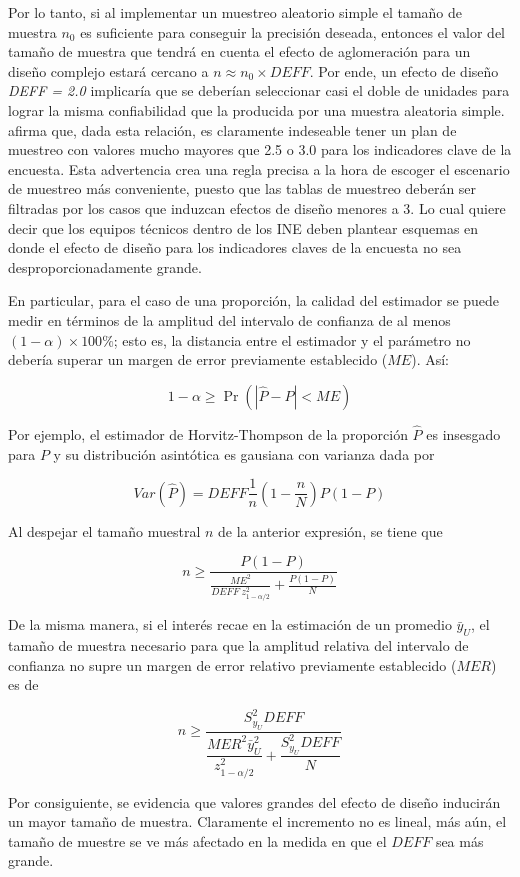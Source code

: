 \documentclass[
  12pt,
]{book}
\begin{document}
Por lo tanto, si al implementar un muestreo aleatorio simple el tamaño de muestra \(n_0\) es suficiente para conseguir la precisión deseada, entonces el valor del tamaño de muestra que tendrá en cuenta el efecto de aglomeración para un diseño complejo estará cercano a \(n \approx n_0 \times DEFF\). Por ende, un efecto de diseño \emph{DEFF = 2.0} implicaría que se deberían seleccionar casi el doble de unidades para lograr la misma confiabilidad que la producida por una muestra aleatoria simple. \citet{United_Nations_2008} afirma que, dada esta relación, es claramente indeseable tener un plan de muestreo con valores mucho mayores que 2.5 o 3.0 para los indicadores clave de la encuesta. Esta advertencia crea una regla precisa a la hora de escoger el escenario de muestreo más conveniente, puesto que las tablas de muestreo deberán ser filtradas por los casos que induzcan efectos de diseño menores a 3. Lo cual quiere decir que los equipos técnicos dentro de los INE deben plantear esquemas en donde el efecto de diseño para los indicadores claves de la encuesta no sea desproporcionadamente grande.

En particular, para el caso de una proporción, la calidad del estimador se puede medir en términos de la amplitud del intervalo de confianza de al menos \((1-\alpha) \times 100\%\); esto es, la distancia entre el estimador y el parámetro no debería superar un margen de error previamente establecido (\(ME\)). Así:

\[
1-\alpha \geq \Pr\left(|\hat{P}-P|<ME\right)
\]

Por ejemplo, el estimador de Horvitz-Thompson de la proporción \(\hat{P}\) es insesgado para \(P\) y su distribución asintótica es gausiana con varianza dada por

\[
Var\left(\hat{P}\right)=DEFF\frac{1}{n}(1-\frac{n}{N})P(1-P)
\]

Al despejar el tamaño muestral \(n\) de la anterior expresión, se tiene que

\[
n\geq\frac{P(1-P)}{\frac{ME^2}{DEFF \ z_{1-\alpha/2}^2}+\frac{P(1-P)}{N}}
\]

De la misma manera, si el interés recae en la estimación de un promedio \(\bar{y}_U\), el tamaño de muestra necesario para que la amplitud relativa del intervalo de confianza no supre un margen de error relativo previamente establecido (\(MER\)) es de

\[
n \geq \dfrac{S^2_{y_U}DEFF}{\dfrac{MER^2 \bar{y}_U^2}{z_{1-\alpha/2}^2}+\dfrac{S^2_{y_U}DEFF}{N}}
\]

Por consiguiente, se evidencia que valores grandes del efecto de diseño inducirán un mayor tamaño de muestra. Claramente el incremento no es lineal, más aún, el tamaño de muestre se ve más afectado en la medida en que el \(DEFF\) sea más grande.
\end{document}
